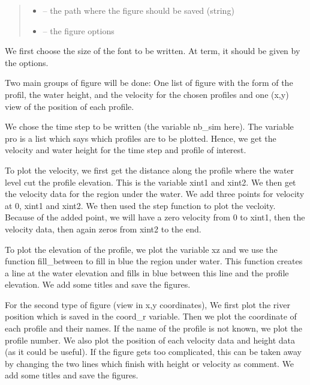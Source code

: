 \documentclass[letterpaper,10pt,english]{sphinxmanual}
\begin{document}
\begin{fulllineitems}
\begin{quote}
\begin{description}
\begin{itemize}
\item {} 
 -- the path where the figure should be saved (string)

\item {} 
 -- the figure options

\end{itemize}

\end{description}\end{quote}


We first choose the size of the font to be written. At term, it should be given by the options.

Two main groups of figure will be done: One list of figure with the form of the profil, the water height, and the
velocity for the chosen profiles and one (x,y) view of the position of each profile.

We chose the time step to be written (the variable nb\_sim here). The variable pro is a list which says which
profiles are to be plotted. Hence, we get the velocity and water height for the time step and profile of interest.

To plot the velocity, we first get the distance along the profile where the water level cut the profile elevation.
This is the variable xint1 and xint2. We then get the velocity data for the region under the water. We add three
points for velocity at 0, xint1 and xint2. We then used the step function to plot the vecloity. Because of the added
point, we will have a zero velocity from 0 to xint1, then the velocity data, then again zeros from xint2 to the end.

To plot the elevation of the profile, we plot the variable xz and we use the function fill\_between to fill
in blue the region under water. This function creates a line at the water elevation and fills in blue between this
line and the profile elevation. We add some titles and save the figures.

For the second type of figure (view in x,y coordinates), We first plot the river position which is saved in the
coord\_r variable. Then we plot the coordinate of each profile and their names. If the name of the profile is not
known, we plot the profile number.  We also plot the position of each velocity data and height data (as it could be
useful). If the figure gets too complicated, this can be taken away by changing the two lines which finish
with height or velocity as comment.  We add some titles and save the figures.

\end{fulllineitems}
\end{document}

